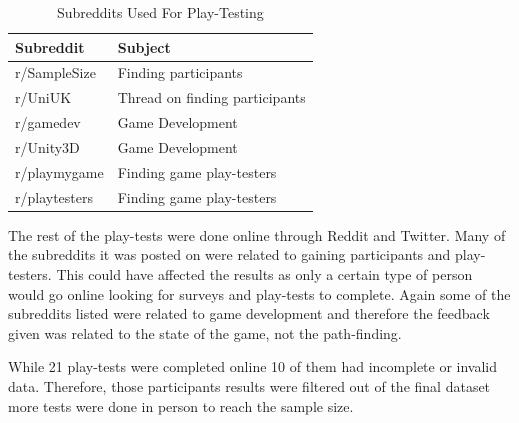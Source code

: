 \documentclass[journal]{IEEEtran}
\begin{document}
	\begin{table}[H]
		\centering
		\caption{Subreddits Used For Play-Testing}
		\label{table:Subreddits}
		\def\arraystretch{1.5}
		\begin{tabular}{ |l|l|}
			\hline
			\textbf{Subreddit}        & \textbf{Subject} \\     \hline
			r/SampleSize              & Finding participants  \\ \hline
			r/UniUK                   & Thread on finding participants \\ \hline
			r/gamedev                 & Game Development \\ \hline
			r/Unity3D                 & Game Development \\ \hline
			r/playmygame              & Finding game play-testers \\ \hline
			r/playtesters             & Finding game play-testers \\ \hline
		\end{tabular}
	\end{table}
	
	The rest of the play-tests were done online through Reddit and Twitter. Many of the subreddits it was posted on were related to gaining participants and play-testers. This could have affected the results as only a certain type of person would go online looking for surveys and play-tests to complete. Again some of the subreddits listed were related to game development and therefore the feedback given was related to the state of the game, not the path-finding.     
	
	While 21 play-tests were completed online 10 of them had incomplete or invalid data. Therefore, those participants results were filtered out of the final dataset more tests were done in person to reach the sample size.     
	
	
\end{document}
